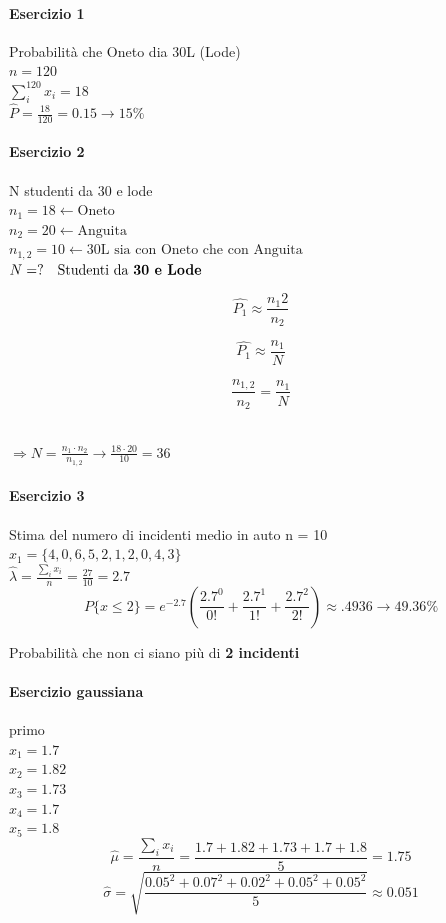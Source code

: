 \documentclass[]{article}
\begin{document}
    \paragraph{Esercizio 1} Probabilità che Oneto dia 30L (Lode) \\
    $n = 120$ \\
    $\sum_{i}^{120} x_i = 18$ \\
    $\hat{P} = \frac{18}{120} = 0.15 \rightarrow 15\%$ \\
    \paragraph{Esercizio 2} N studenti da 30 e lode \\
    $n_1 = 18 \leftarrow \text{Oneto}$ \\ 
    $n_2 = 20 \leftarrow \text{Anguita}$ \\
    $n_{1,2} = 10 \leftarrow \text{30L sia con Oneto che con Anguita}$ \\
    $N= ? \quad \text{Studenti da \textbf{30 e Lode}}$ \\
    \begin{minipage}{0.30\textwidth}
        \[ \hat{P_1} \approx \frac{n_1 2}{n_2} \]
    \end{minipage}
    \begin{minipage}{0.30\textwidth}
        \[ \hat{P_1} \approx \frac{n_1}{N} \]
    \end{minipage}
    \begin{minipage}{0.30\textwidth}
        \[ \frac{n_{1,2}}{n_2} = \frac{n_1}{N} \]
    \end{minipage} \\
    $ \Longrightarrow N= \frac{n_1 \cdot n_2}{n_{1,2}} \rightarrow \frac{18 \cdot 20}{10} = 36 $

    \paragraph{Esercizio 3} Stima del numero di incidenti medio in auto n = 10 \\
    $x_1 = \{ 4,0,6,5,2,1,2,0,4,3 \}$ \\
    $\hat{\lambda} = \frac{\sum_{i}^{} x_i}{n} = \frac{27}{10} = 2.7$
    \[ P\{x \leq 2 \} = e^{-2.7} (\frac{2.7^0}{0!} + \frac{2.7^1}{1!} + \frac{2.7^2}{2!}) \approx .4936 \rightarrow 49.36\% \]
    \centerline{Probabilità che non ci siano più di \textbf{2 incidenti} }
    
    \paragraph{Esercizio gaussiana} primo \\
    $x_1 = 1.7$ \\
    $x_2 = 1.82$ \\
    $x_3 = 1.73$\\
    $x_4 = 1.7$\\
    $x_5 = 1.8$ \\
    \[ \hat{\mu} = \frac{\sum_{i}^{} x_i}{n} = \frac{1.7 + 1.82 + 1.73 + 1.7 + 1.8}{5} = 1.75 \]
    \[ \hat{\sigma} = \sqrt{\frac{0.05^2 + 0.07^2 + 0.02^2 + 0.05^2 + 0.05^2}{5}} \approx 0.051 \]
\end{document}
